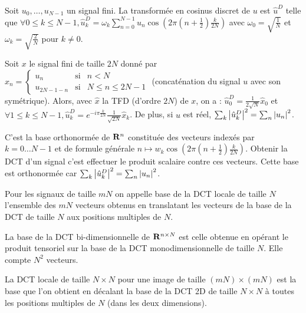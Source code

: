 \begin{defn}
	Soit $u_0,\ldots,u_{N - 1}$ un signal fini.
	La transformée en cosinus discret de $u$ est $\hat{u}^D$ telle que
	$\forall 0 \leq k \leq N - 1, \hat{u}^D_k = \omega_k \sum_{n = 0}^{N - 1} u_n \cos \left( 2\pi \left( n + \frac{1}{2} \right) \frac{k}{2N} \right)$
	avec $\omega_0 = \sqrt{\frac{1}{N}}$ et $\omega_k = \sqrt{\frac{2}{N}}$ pour $k \neq 0$.
\end{defn}

\begin{pop}
	Soit $x$ le signal fini de taille $2N$ donné par
	$x_n = \left\{ \begin{array}{ccl}
		u_n & \text{si} & n < N \\
		u_{2N - 1 - n} & \text{si} & N \leq n \leq 2N - 1
	\end{array}\right .$
	(concaténation du signal $u$ avec son symétrique).
	Alors, avec $\hat{x}$ la TFD (d'ordre $2N$) de $x$, on a :
	$\hat{u}^D_0 = \frac{1}{2\sqrt{N}} \hat{x}_0$
	et $\forall 1 \leq k \leq N - 1, \hat{u}_k^D = e^{-i\pi \frac{k}{2N}} \frac{1}{\sqrt{2N}} \hat{x}_k$.
	De plus, si $u$ est réel, $\sum_k \left\lvert\hat{u}_k^D\right\rvert^2 = \sum_n \left\lvert u_n\right\rvert^2$.
\end{pop}

\begin{defn}
	C'est la base orthonormée de $\mathbf{R}^n$ constituée des vecteurs indexés par $k = 0 \ldots N-1$ et de formule générale
	$n \mapsto w_k \cos \left( 2\pi \left( n + \frac{1}{2} \right) \frac{k}{2N} \right)$.
	Obtenir la DCT d'un signal c'est effectuer le produit scalaire contre ces vecteurs.
	Cette base est orthonormée car $\sum_k \left\lvert\hat{u}_k^D\right\rvert^2 = \sum_n \left\lvert u_n\right\rvert^2$.
\end{defn}

\begin{defn}
	Pour les signaux de taille $mN$ on appelle base de la DCT locale de taille $N$ l'ensemble des $mN$ vecteurs obtenus en translatant les vecteurs de la base de la DCT de taille $N$ aux positions multiples de $N$.
\end{defn}

\begin{defn}[DCT 2D]
	La base de la DCT bi-dimensionnelle de $\mathbf{R}^{n \times N}$ est celle obtenue en opérant le produit tensoriel sur la base de la DCT monodimensionnelle de taille $N$.
	Elle compte $N^2$ vecteurs.
\end{defn}

\begin{defn}
	La DCT locale de taille $N \times N$ pour une image de taille $(mN) \times (mN)$ est la base que l'on obtient en décalant la base de la DCT 2D de taille $N \times N$ à toutes les positions multiples de $N$ (dans les deux dimensions).
\end{defn}